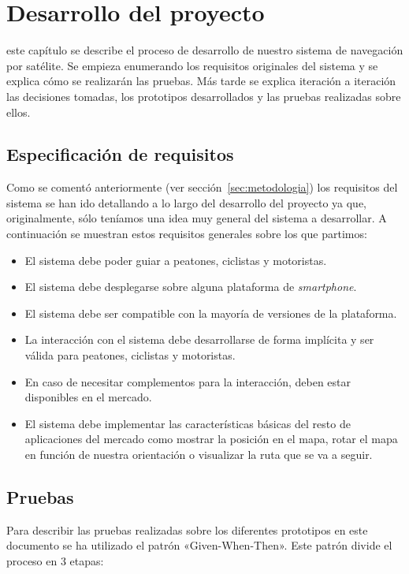 \chapter{Desarrollo del proyecto}
\label{chap:desarrollo}

 este capítulo se describe el proceso de desarrollo de nuestro sistema de navegación por
satélite. Se empieza enumerando los requisitos originales del sistema y se explica cómo se
realizarán las pruebas. Más tarde se explica iteración a iteración las decisiones tomadas, los
prototipos desarrollados y las pruebas realizadas sobre ellos.

\section{Especificación de requisitos}

Como se comentó anteriormente (ver sección~\ref{sec:metodologia}) los requisitos del sistema se
han ido detallando a lo largo del desarrollo del proyecto ya que, originalmente, sólo teníamos una
idea muy general del sistema a desarrollar. A continuación se muestran estos requisitos generales
sobre los que partimos:

\begin{itemize}
  \item El sistema debe poder guiar a peatones, ciclistas y motoristas.
  \item El sistema debe desplegarse sobre alguna plataforma de \emph{smartphone}.
  \item El sistema debe ser compatible con la mayoría de versiones de la plataforma.
  \item La interacción con el sistema debe desarrollarse de forma implícita y ser válida para
    peatones, ciclistas y motoristas.
  \item En caso de necesitar complementos para la interacción, deben estar disponibles en el
    mercado.
  \item El sistema debe implementar las características básicas del resto de aplicaciones del
    mercado como mostrar la posición en el mapa, rotar el mapa en función de nuestra orientación o
    visualizar la ruta que se va a seguir.
\end{itemize}

\section{Pruebas}

Para describir las pruebas realizadas sobre los diferentes prototipos en este documento se ha
utilizado el patrón «Given-When-Then». Este patrón divide el proceso en 3 etapas:

